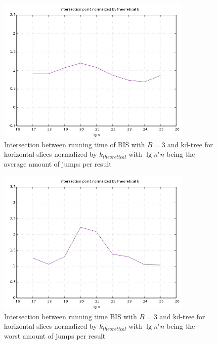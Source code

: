 \begin{figure}[h]
    \centering
    \includegraphics[width = 0.85\textwidth]{pictures/analysis/threes/hori_avg.png}
    \caption{Intersection between running time of BIS with $B=3$ and kd-tree for horizontal slices normalized by $k_{theoretical}$ with $\lg n^\epsilon n$ being the average amount of jumps per result}\label{fig:b3_hori_theory}
\end{figure}

\begin{figure}[h]
    \centering
    \includegraphics[width = 0.85\textwidth]{pictures/analysis/threes/hori_worst.png}
    \caption{Intersection between running time BIS with $B=3$ and kd-tree for horizontal slices normalized by $k_{theoretical}$ with $\lg n^\epsilon n$ being the worst amount of jumps per result}\label{fig:b3_hori_theory_worst}
\end{figure}
\clearpage


